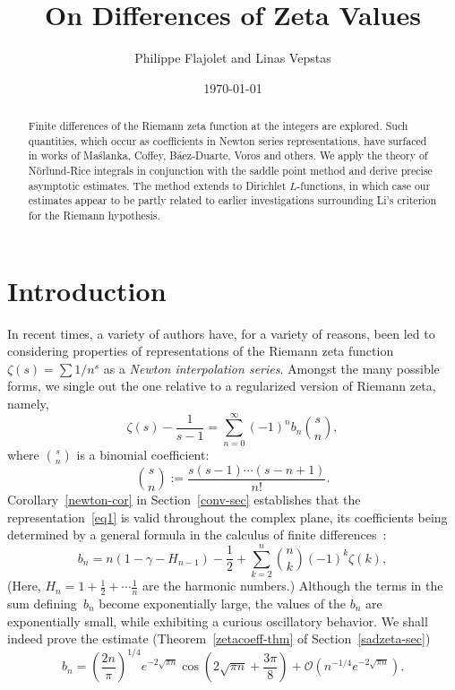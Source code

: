 \documentclass{amsart}
\begin{document}
\date{\today}
\title{On Differences of Zeta Values}
\author{Philippe Flajolet and Linas Vepstas}

\begin{abstract}
Finite differences of the Riemann zeta function at the integers
are explored. Such quantities, which occur as coefficients in Newton series representations, 
have surfaced in works of Ma{\'s}lanka, Coffey, B{\'a}ez-Duarte, Voros and others.
We apply the theory of N\"orlund-Rice integrals in conjunction with
the saddle point method  and derive precise 
asymptotic estimates. The method extends to Dirichlet $L$-functions,
in which case our estimates appear to be partly related to
earlier investigations surrounding Li's criterion for the Riemann hypothesis.
\end{abstract}

\maketitle

\section*{Introduction}


 


In recent  times, a variety of  authors have, for a variety  of reasons,
been led  to considering   properties  of  representations of   the
Riemann zeta function $\zeta(s)=\sum 1/n^s$  as a \emph{Newton interpolation
series}.  Amongst the many  possible  forms, we single out
the one relative to a regularized version of Riemann zeta, namely,
\begin{equation}\label{eq1}
\zeta(s)-\frac{1}{s-1}=\sum_{n=0}^\infty
(-1)^n b_n \binom{s}{n},
\end{equation}
where $\binom{s}{n}$ is a binomial coefficient:
\[
\binom{s}{n}:=\frac{s(s-1)\cdots(s-n+1)}{n!}.
\]
Corollary~\ref{newton-cor} in Section~\ref{conv-sec}
establishes that the representation~\eqref{eq1} is
valid throughout the complex plane,
its coefficients being determined by a general formula in the calculus of finite
differences~\cite{Jordan65,Milne81,Norlund54}:
\begin{equation}\label{eq2}
b_n=
n(1-\gamma-H_{n-1})-\frac12+\sum_{k=2}^n \binom{n}{k}
(-1)^k\zeta(k),
\end{equation}
(Here,
$H_n=1+\frac12+\cdots\frac1n$ are the harmonic numbers.)
Although the terms in the sum defining~$b_n$ become
exponentially large, the values of the $b_n$ are exponentially small,
while exhibiting a curious oscillatory behavior. 
We shall indeed prove the estimate (Theorem~\ref{zetacoeff-thm} of Section~\ref{sadzeta-sec}) 
\begin{equation}\label{asympform}
b_n =\left(\frac{2n}{\pi}\right)^{1/4}e^{-2\sqrt{\pi n}}\cos\left(2\sqrt{\pi n}+\frac{3\pi}{8}\right)
+\mathcal{O}\left(n^{-1/4} e^{-2\sqrt{\pi n}}\right).
\end{equation}
\end{document}
